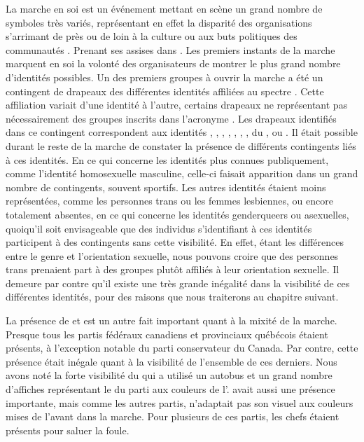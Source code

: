 La marche en soi est un événement mettant en scène un grand nombre de symboles très variés, représentant en effet la disparité des organisations s'arrimant de près ou de loin à la culture ou aux buts politiques des communautés \lgbt.
Prenant ses assises dans .
Les premiers instants de la marche marquent en soi la volonté des organisateurs de montrer le plus grand nombre d'identités possibles.
Un des premiers groupes à ouvrir la marche a été un contingent de drapeaux des différentes identités affiliées au spectre \lgbt{}.
Cette affiliation variait d'une identité à l'autre, certains drapeaux ne représentant pas nécessairement des groupes inscrits dans l'acronyme \lgbt.
Les drapeaux identifiés dans ce contingent correspondent aux identités , , , , , , , du , ou .
Il était possible durant le reste de la marche de constater la présence de différents contingents liés à ces identités.
En ce qui concerne les identités plus connues publiquement, comme l'identité homosexuelle masculine, celle-ci faisait apparition dans un grand nombre de contingents, souvent sportifs.
Les autres identités étaient moins représentées, comme les personnes trans ou les femmes lesbiennes, ou encore totalement absentes, en ce qui concerne les identités genderqueers ou asexuelles, quoiqu'il soit envisageable que des individus s'identifiant à ces identités participent à des contingents sans cette visibilité.
En effet, étant les différences entre le genre et l'orientation sexuelle, nous pouvons croire que des personnes trans prenaient part à des groupes plutôt affiliés à leur orientation sexuelle.
Il demeure par contre qu'il existe une très grande inégalité dans la visibilité de ces différentes identités, pour des raisons que nous traiterons au chapitre suivant.

La présence de  et  est un autre fait important quant à la mixité de la marche.
Presque tous les partis fédéraux canadiens et provinciaux québécois étaient présents, à l'exception notable du parti conservateur du Canada.
Par contre, cette présence était inégale quant à la visibilité de l'ensemble de ces derniers.
Nous avons noté la forte visibilité du  qui a utilisé un autobus et un grand nombre d'affiches représentant le  du parti aux couleurs de l'.
 avait aussi une présence importante, mais comme les autres partis, n'adaptait pas son visuel aux couleurs mises de l'avant dans la marche.
Pour plusieurs de ces partis, les chefs étaient présents pour saluer la foule.

